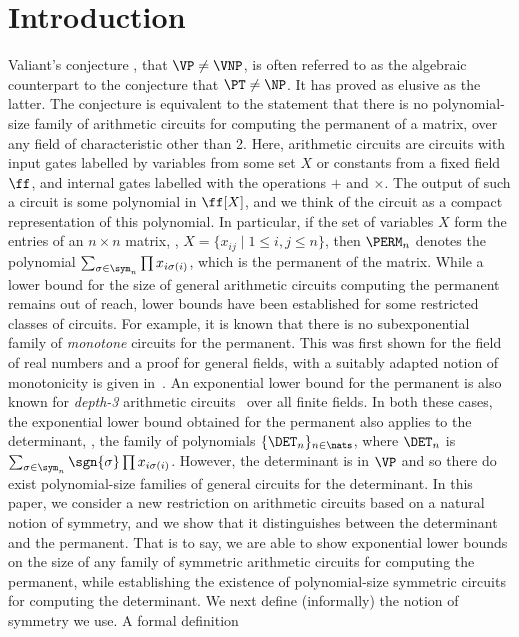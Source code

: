 \documentclass{toc}
\begin{document}
\section{Introduction}\label{sec:introduction}
Valiant's conjecture \cite{Valiant79}, that $\VP\neq\VNP$, is often referred to
as the algebraic counterpart to the conjecture that $\PT\neq\NP$. It has proved
as elusive as the latter. The conjecture is equivalent to the statement that
there is no polynomial-size family of arithmetic circuits for computing the
permanent of a matrix, over any field of characteristic other than 2. Here,
arithmetic circuits are circuits with input gates labelled by variables from
some set $X$ or constants from a fixed field $\ff$, and internal gates labelled
with the operations $+$ and $\times$. The output of such a circuit is some
polynomial in $\ff[X]$, and we think of the circuit as a compact representation
of this polynomial. In particular, if the set of variables $X$ form the entries
of an $n\times n$ matrix, \ie, $X = \{x_{ij} \mid 1\leq i,j \leq n\}$, then
$\PERM_n$ denotes the polynomial $\sum_{\sigma \in \sym_n}\prod x_{i\sigma(i)}$,
which is the permanent of the matrix.
While a lower bound for the size of general arithmetic circuits computing the
permanent remains out of reach, lower bounds have been established for some
restricted classes of circuits. For example, it is known that there is no
subexponential family of \emph{monotone} circuits for the permanent. This was
first shown for the field of real numbers \cite{JerrumS82} and a proof for
general fields, with a suitably adapted notion of monotonicity is given
in~\cite{KayalS14}. An exponential lower bound for the permanent is also known
for \emph{depth-3} arithmetic circuits~\cite{GK98} over all finite fields. In
both these cases, the exponential lower bound obtained for the permanent also
applies to the determinant, \ie, the family of polynomials $\{\DET_n\}_{n \in
  \nats}$, where $\DET_n$ is $\sum_{\sigma \in \sym_n} \sgn{\sigma}\prod
x_{i\sigma(i)}$. However, the determinant is in $\VP$ and so there do exist
polynomial-size families of general circuits for the determinant.
In this paper, we consider a new restriction on arithmetic circuits based on a
natural notion of symmetry, and we show that it distinguishes between the
determinant and the permanent. That is to say, we are able to show exponential
lower bounds on the size of any family of symmetric arithmetic circuits for
computing the permanent, while establishing the existence of polynomial-size
symmetric circuits for computing the determinant.
We next define (informally) the notion of symmetry we use. A formal definition
\end{document}

